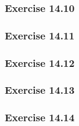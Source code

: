 \documentclass{article}
\begin{document}
\subsubsection*{Exercise 14.10}



\subsubsection*{Exercise 14.11}



\subsubsection*{Exercise 14.12}



\subsubsection*{Exercise 14.13}



\subsubsection*{Exercise 14.14}




\subsubsection*{}
\end{document}
